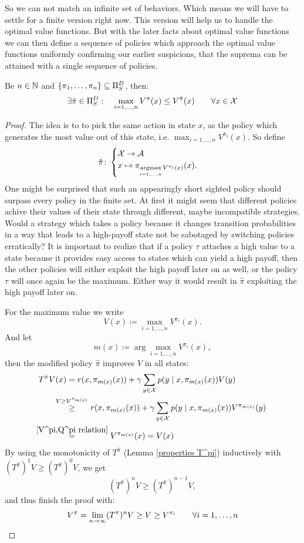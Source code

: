 So we can not match an infinite set of behaviors. Which means we will have to settle for a finite version right now. This version will help us to handle the optimal value functions. But with the later facts about optimal value functions we can then define a sequence of policies which approach the optimal value functions uniformly confirming our earlier suspicions, that the suprema can be attained with a single sequence of policies. 

\begin{prop}\label{finite outmatching}
	Be \(n\in\mathbb{N}\) and \(\{\pi_1,\dots,\pi_n\}\subseteq \Pi_S^D \), then:
	\[\exists \hat{\pi}\in\Pi_S^D: \quad \max_{i=1,\dots,n} V^\pi(x)\le V^{\hat{\pi}}(x) \qquad \forall x\in\mathcal{X} \]
\end{prop}
\begin{proof}
	The idea is to to pick the same action in state \(x\), as the policy which generates the most value out of this state, i.e. \(\max_{i=1,\dots,n}V^{\pi_i}(x)\). So define
	\[
		\hat{\pi}\colon
	\begin{cases} 
		\mathcal{X}\to\mathcal{A}\\
		x\mapsto \pi_{\mathop{\text{argmax}}\limits_{i=1,\dots,n}V^{\pi_i}(x)}(x).
	\end{cases}
	\]
	One might be surprised that such an appearingly short sighted policy should surpass every policy in the finite set. At first it might seem that different policies achive their values of their state through different, maybe incompatible strategies. Would a strategy which takes a policy because it changes transition probabilities in a way that leads to a high-payoff state not be sabotaged by switching policies erratically?
	It is important to realize that if a policy \(\tau\) attaches a high value to a state because it provides easy access to states which can yield a high payoff, then the other policies will either exploit the high payoff later on as well, or the policy \(\tau\) will once again be the maximum. Either way it would result in \(\hat{\pi}\) exploiting the high payoff later on. 

	For the maximum value we write
	\[
		V(x)\coloneqq \max_{i=1,\dots, n}V^{\pi_i}(x).
	\]
	And let
	\[
		m(x) \coloneqq \arg\max_{i=1,\dots,n}V^{\pi_i}(x),
	\]
	then the modified policy \(\hat{\pi}\) improves \(V\) in all states:
	\begin{align*}
		T^{\hat{\pi}}V(x)&=r(x,\pi_{m(x)}(x))
		+\gamma \sum_{y\in\cX} p(y\mid x,\pi_{m(x)}(x))V(y)\\
		&\lxgq{V\ge V^{\pi_{m(x)}}} r(x,\pi_{m(x)}(x))
		+\gamma \sum_{y\in\cX} p(y\mid x,\pi_{m(x)}(x))V^{\pi_{m(x)}}(y)\\
		&\lxeq{\ref{V^pi,Q^pi relation}} V^{\pi_{m(x)}}(x)=V(x)
	\end{align*}
	By using the monotonicity of \(T^{\hat{\pi}} \) (Lemma \ref{properties T^pi}) inductively with \((T^{\hat{\pi}})^1 V \ge (T^{\hat{\pi}})^0 V \), we get
	\[ 
		(T^{\hat{\pi}})^n V \ge (T^{\hat{\pi}})^{n-1} V,
	\]
	and thus finish the proof with:
	\[
		V^{\hat{\pi}} = \lim_{n\to\infty} (T^{\hat{\pi}})^n V 
		\ge V \ge V^{\pi_i}
		\qquad \forall i=1,\dots,n
		\qedhere
	\] 
\end{proof}


